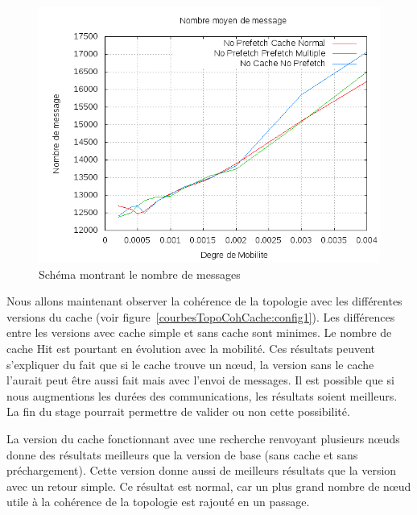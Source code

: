 	\begin{figure}[!h]
        \centering
        \includegraphics[scale=0.5]{../CacheCode/SolipsisPeersim/resultats/Courbes/Courbes_Final_Rapport/Nombre_Messages_Caches.png}
        \caption{Schéma montrant le nombre de messages}
        \label{courbesNbMessCache:config1}
        \end{figure}

Nous allons maintenant observer la cohérence de la topologie avec les différentes versions du cache (voir figure~\ref{courbesTopoCohCache:config1}). Les différences entre les versions avec cache simple et sans cache sont minimes. Le nombre de cache Hit est pourtant en évolution avec la mobilité. Ces résultats peuvent s'expliquer du fait que si le cache trouve un nœud, la version sans le cache l'aurait peut être aussi fait mais avec l'envoi de messages. Il est possible que si nous augmentions les durées des communications, les résultats soient meilleurs. La fin du stage pourrait permettre de valider ou non cette possibilité.
\par La version du cache fonctionnant avec une recherche renvoyant plusieurs nœuds donne des résultats meilleurs que la version de base (sans cache et sans préchargement). Cette version donne aussi de meilleurs résultats que la version avec un retour simple. Ce résultat est normal, car un plus grand nombre de nœud utile à la cohérence de la topologie est rajouté en un passage.


